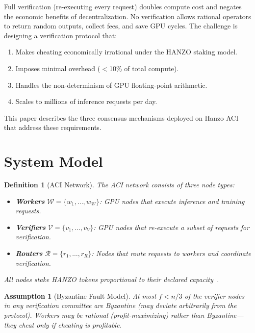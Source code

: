 \documentclass[11pt]{article}
\newtheorem{definition}{Definition}
\newtheorem{assumption}{Assumption}
\begin{document}
Full verification (re-executing every request) doubles compute cost and negates
the economic benefits of decentralization. No verification allows rational
operators to return random outputs, collect fees, and save GPU cycles. The
challenge is designing a verification protocol that:

\begin{enumerate}[leftmargin=1.4em]
    \item Makes cheating economically irrational under the HANZO staking model.
    \item Imposes minimal overhead ($<$10\% of total compute).
    \item Handles the non-determinism of GPU floating-point arithmetic.
    \item Scales to millions of inference requests per day.
\end{enumerate}

This paper describes the three consensus mechanisms deployed on Hanzo
ACI~\cite{hanzoaci} that address these requirements.

\section{System Model}
\label{sec:model}

\begin{definition}[ACI Network]
The ACI network consists of three node types:
\begin{itemize}[leftmargin=1.1em]
    \item \textbf{Workers} $\mathcal{W} = \{w_1, \ldots, w_W\}$: GPU nodes
    that execute inference and training requests.
    \item \textbf{Verifiers} $\mathcal{V} = \{v_1, \ldots, v_V\}$: GPU nodes
    that re-execute a subset of requests for verification.
    \item \textbf{Routers} $\mathcal{R} = \{r_1, \ldots, r_R\}$: Nodes that
    route requests to workers and coordinate verification.
\end{itemize}
All nodes stake HANZO tokens proportional to their declared
capacity~\cite{hanzotokenomics}.
\end{definition}

\begin{assumption}[Byzantine Fault Model]
At most $f < n/3$ of the verifier nodes in any verification committee are
Byzantine (may deviate arbitrarily from the protocol). Workers may be rational
(profit-maximizing) rather than Byzantine---they cheat only if cheating is
profitable.
\end{assumption}
\end{document}
